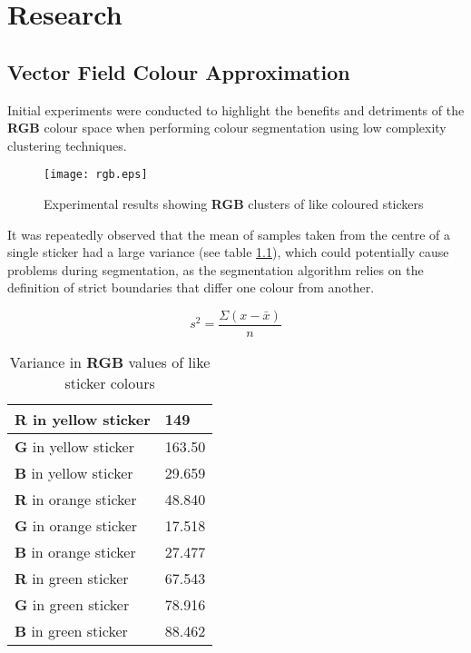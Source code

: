\chapter{Research} %

\label{Research} %


\section{Vector Field Colour Approximation}\label{sec:vector}
Initial experiments were conducted to highlight the benefits and detriments of the \textbf{RGB} colour space when performing colour segmentation using low complexity clustering techniques.

\begin{figure}[h]
  \begin{center}
    \texttt{[image: rgb.eps]}
  \end{center}
  \caption{Experimental results showing \textbf{RGB} clusters of like coloured stickers}
  \label{fig:rgbtest}
\end{figure}

It was repeatedly observed that the mean of samples taken from the centre of a single sticker had a large variance (see table \ref{tab:rgb_var}), which could potentially cause problems during segmentation, as the segmentation algorithm relies on the definition of strict boundaries that differ one colour from another.

\begin{equation} \label{eq:variance}
s^2 = \frac{\Sigma(x-\bar{x})}{n}
\end{equation}

\begin{table}[h]
  \centering
  \begin{tabular}{|l|l|}
    \hline
    \textbf{R} in yellow sticker & 149 \\ \hline
    \textbf{G} in yellow sticker & 163.50 \\ \hline
    \textbf{B} in yellow sticker & 29.659 \\ \hline
    \textbf{R} in orange sticker & 48.840 \\ \hline
    \textbf{G} in orange sticker & 17.518 \\ \hline
    \textbf{B} in orange sticker & 27.477 \\ \hline
    \textbf{R} in green sticker & 67.543 \\ \hline
    \textbf{G} in green sticker & 78.916 \\ \hline
    \textbf{B} in green sticker & 88.462 \\ \hline
  \end{tabular}
  \caption{Variance in \textbf{RGB} values of like sticker colours}
  \label{tab:rgb_var}
\end{table}

